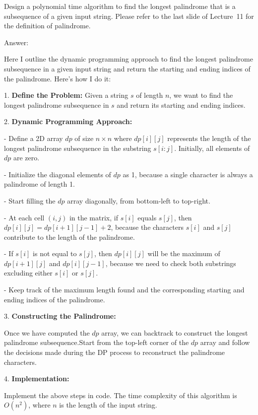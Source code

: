 \documentclass{oxmathproblems}
\begin{document}
\begin{questions}
\miquestion[25]
Design a polynomial time algorithm to find the longest palindrome that is a subsequence of a given input string.
Please refer to the last slide of Lecture~11 for the definition of palindrome.

Answer:

Here I outline the dynamic programming approach to find the longest palindrome subsequence in a given input string and return the starting and ending indices of the palindrome. Here's how I do it:

1. \textbf{Define the Problem:} Given a string $s$ of length $n$, we want to find the longest palindrome subsequence in $s$ and return its starting and ending indices.

2. \textbf{Dynamic Programming Approach:}

   - Define a 2D array $dp$ of size $n \times n$ where $dp[i][j]$ represents the length of the longest palindrome subsequence in the substring $s[i:j]$. Initially, all elements of $dp$ are zero.
   
   - Initialize the diagonal elements of $dp$ as 1, because a single character is always a palindrome of length 1.
   
   - Start filling the $dp$ array diagonally, from bottom-left to top-right.
   
   - At each cell $(i, j)$ in the matrix, if $s[i]$ equals $s[j]$, then $dp[i][j] = dp[i+1][j-1] + 2$, because the characters $s[i]$ and $s[j]$ contribute to the length of the palindrome.
   
   - If $s[i]$ is not equal to $s[j]$, then $dp[i][j]$ will be the maximum of $dp[i+1][j]$ and $dp[i][j-1]$, because we need to check both substrings excluding either $s[i]$ or $s[j]$.
   
   - Keep track of the maximum length found and the corresponding starting and ending indices of the palindrome.
   
3. \textbf{Constructing the Palindrome:}

   Once we have computed the $dp$ array, we can backtrack to construct the longest palindrome subsequence.Start from the top-left corner of the $dp$ array and follow the decisions made during the DP process to reconstruct the palindrome characters.

4. \textbf{Implementation:}

   Implement the above steps in code. The time complexity of this algorithm is $O(n^2)$, where $n$ is the length of the input string.


\end{questions}
\end{document}
